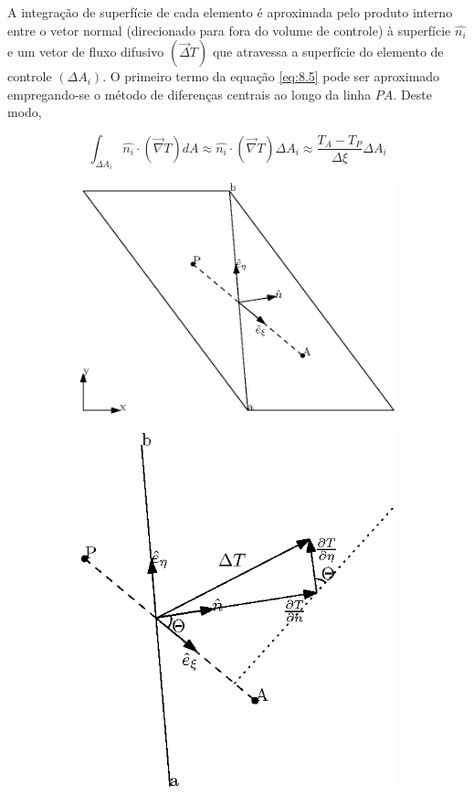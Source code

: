 A integração de superfície de cada elemento é aproximada pelo produto interno entre o vetor normal (direcionado para fora do volume de controle) à superfície $\hat{n_i}$ e um vetor de fluxo difusivo $(\vec{\Delta}T)$ que atravessa a superfície do elemento de controle $(\Delta A_i)$. O primeiro termo da equação \ref{eq:8.5} pode ser aproximado empregando-se o método de diferenças centrais ao longo da linha $PA$. Deste modo,

\begin{equation}
    \label{eq:8.6}
    \int_{\Delta A_i} \hat{n_i} \cdot (\vec{\nabla}T)dA \approx \hat{n_i} \cdot (\vec{\nabla}T) \Delta A_i \approx \frac{T_A - T_P}{\Delta \xi} \Delta A_i
\end{equation}

\begin{figure}[ht]
    \begin{subfigure}{.5\textwidth}
        \centering
        \includegraphics[width=.8\linewidth]{fig/difusao-cruzada-a.eps}
        \caption{}
        \label{fig:8.1-a}
    \end{subfigure}
    \begin{subfigure}{.5\textwidth}
        \centering
        \includegraphics[width=.8\linewidth]{fig/difusao-cruzada-b.eps}
        \caption{}
        \label{fig:8.1-b}
    \end{subfigure}


\end{figure}
